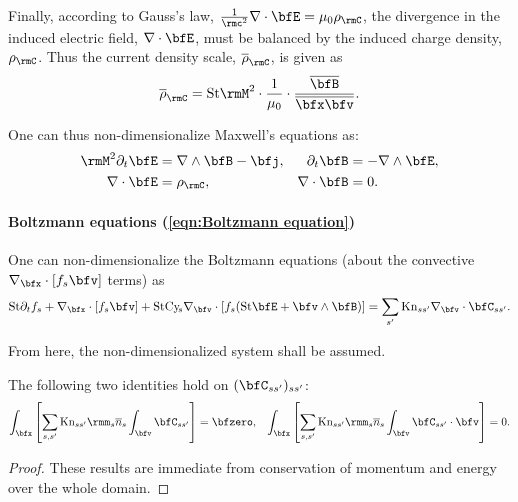     Finally, according to Gauss's law, $\frac{1}{\rmc^{2}}\nabla\cdot\bfE  =  \mu_{0}\rho_{\rmC}$, the divergence in the induced electric field, $\nabla\cdot\bfE$, must be balanced by the induced charge density, $\rho_{\rmC}$. Thus the current density scale, $\overline{\rho}_{\rmC}$, is given as
    \begin{equation}
        \overline{\rho}_{\rmC}  =  \rmSt\rmM^{2}\cdot\frac{1}{\mu_{0}}\cdot\frac{\overline{\bfB}}{\overline{\bfx}\overline{\bfv}}.
    \end{equation}
    
    One can thus non-dimensionalize Maxwell's equations as:
    \begin{align}
        \rmM^{2}\partial_{t}\bfE  &=  \nabla\wedge\bfB - \bfj,  &
        \partial_{t}\bfB  &=  - \nabla\wedge\bfE,  \label{eqn:Maxwell's equations transient non-dimensionalized}  \\
        \nabla\cdot\bfE  &=  \rho_{\rmC},  &
        \nabla\cdot\bfB  &=  0.  \label{eqn:Maxwell's equations steady-state non-dimensionalized}
    \end{align}

    \paragraph*{Boltzmann equations (\ref{eqn:Boltzmann equation})} One can non-dimensionalize the Boltzmann equations (about the convective $\nabla_{\bfx}\cdot[f_{s}\bfv]$ terms) as
    \begin{equation}\label{eqn:Boltzmann equation non-dimensionalized}
        \rmSt\partial_{t}f_{s} + \nabla_{\bfx}\cdot[f_{s}\bfv] + \rmSt\rmCy\!_{s}\nabla_{\bfv}\cdot[f_{s}(\rmSt\bfE + \bfv\wedge\bfB)]  =   \sum_{s'}\rmKn_{ss'}\nabla_{\bfv}\cdot\bfC_{ss'}.
    \end{equation}
    
    \shortline

    From here, the non-dimensionalized system shall be assumed.
    
    \begin{lemma}\label{lem:conservation on collision operators}
        The following two identities hold on $(\bfC_{ss'})_{ss'}$:
        \begin{align}
            \int_{\bfx}\left[\sum_{s, s'}\rmKn_{ss'}\rmm_{s}\overline{n}_{s}\int_{\bfv}\bfC_{ss'}\right]           =  \bfzero,  &&
            \int_{\bfx}\left[\sum_{s, s'}\rmKn_{ss'}\rmm_{s}\overline{n}_{s}\int_{\bfv}\bfC_{ss'}\cdot\bfv\right]  =  0.
        \end{align}
    \end{lemma}
    \begin{proof}
        These results are immediate from conservation of momentum and energy over the whole domain.
    \end{proof}
    